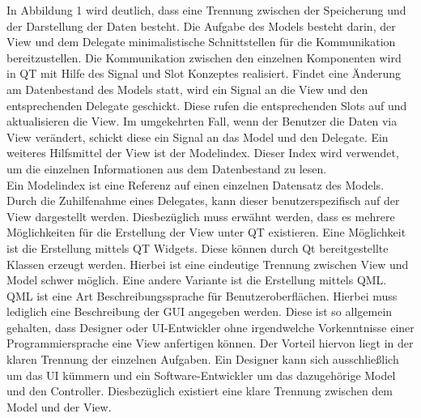 In Abbildung 1 wird deutlich, dass eine Trennung zwischen der Speicherung und der Darstellung der Daten besteht. Die Aufgabe des Models besteht darin, der View und dem Delegate minimalistische Schnittstellen für die Kommunikation bereitzustellen. Die Kommunikation zwischen den einzelnen Komponenten wird in QT mit Hilfe des Signal und Slot Konzeptes realisiert. Findet eine Änderung am Datenbestand des Models statt, wird ein Signal an die View und den entsprechenden Delegate geschickt. Diese rufen die entsprechenden Slots auf und aktualisieren die View. Im umgekehrten Fall, wenn der Benutzer die Daten via View verändert, schickt diese ein Signal an das Model und den Delegate. Ein weiteres Hilfsmittel der View ist der Modelindex. Dieser Index wird verwendet, um die einzelnen Informationen aus dem Datenbestand zu lesen. \\

Ein Modelindex ist eine Referenz auf einen einzelnen Datensatz des Models. Durch die Zuhilfenahme eines Delegates, kann dieser benutzerspezifisch auf der View dargestellt werden. Diesbezüglich muss erwähnt werden, dass es mehrere Möglichkeiten für die Erstellung der View unter QT existieren. Eine Möglichkeit ist die Erstellung mittels QT Widgets. Diese können durch Qt bereitgestellte Klassen erzeugt werden. Hierbei ist eine eindeutige Trennung zwischen View und Model schwer möglich. Eine andere Variante ist die Erstellung mittels QML. QML ist eine Art Beschreibungssprache für Benutzeroberflächen. Hierbei muss lediglich eine Beschreibung der GUI angegeben werden. Diese ist so allgemein gehalten, dass Designer oder UI-Entwickler ohne irgendwelche Vorkenntnisse einer Programmiersprache eine View anfertigen können. Der Vorteil hiervon liegt in der klaren Trennung der einzelnen Aufgaben. Ein Designer kann sich ausschließlich um das UI kümmern und ein Software-Entwickler um das dazugehörige Model und den Controller. Diesbezüglich existiert eine klare Trennung zwischen dem Model und der View.\\


